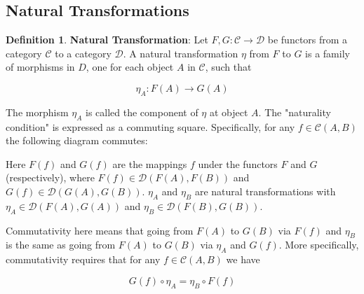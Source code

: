 \documentclass{article}
\theoremstyle{definition}
\newtheorem{definition}{Definition}[section]
\begin{document}
\subsection{Natural Transformations}
\label{subsection:naturl_transformations}

\begin{definition} 
\label{definition:natural_transformation}
{\bf Natural Transformation}: Let $F,G: \mathcal{C} \to
\mathcal{D}$ be functors from a category $\mathcal{C}$ to 
a category $\mathcal{D}$. A natural transformation $\eta$ 
from $F$ to $G$ is a family of morphisms in $D$, one for 
each object $A$ in $\mathcal{C}$, such that

\begin{equation*}
\eta_{A}:F(A)\to G(A)
\end{equation*}
\end{definition}

\medskip
\noindent
The morphism $\eta_{A}$ is called the component of 
$\eta$ at object $A$. The "naturality condition"
is expressed as a commuting square. Specifically,
for any $f \in \mathcal{C}(A,B)$ the following diagram
commutes:
%
%
%
\medskip
%
%
%
%
%
\begin{center}
\end{center}


\medskip
\noindent
Here $F(f)$ and $G(f)$ 
are the mappings $f$ under the functors $F$ and $G$ 
(respectively), where $F(f) \in \mathcal{D}(F(A),F(B))$ 
and $G(f) \in \mathcal{D}(G(A),G(B))$. $\eta_{A}$ and 
$\eta_{B}$ are natural transformations with $\eta_{A} 
\in \mathcal{D}(F(A),G(A))$ and $\eta_{B} \in 
\mathcal{D}(F(B),G(B))$.

\bigskip
\noindent
Commutativity here means that going from $F(A)$ to $G(B)$ via
$F(f)$ and $\eta_{B}$ is the same as going from $F(A)$ to $G(B)$
via $\eta_{A}$ and $G(f)$.  More specifically, commutativity
requires that for any $f \in \mathcal{C}(A,B)$ we have 

\begin{equation}
G(f) \circ \eta_{A} = \eta_{B} \circ F(f)
\label{equation:commutivity}
\end{equation}
\end{document}
